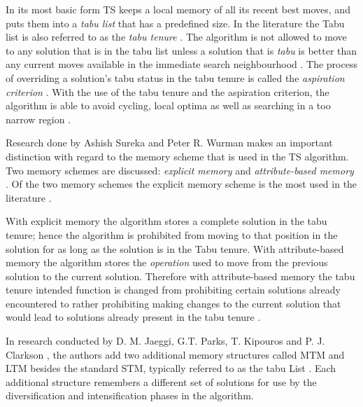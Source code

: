 In its most basic form \gls{TS} keeps a local memory of all its recent best moves, and puts them into a \emph{tabu list} that has a predefined size. In the literature the Tabu list is also referred to as the \emph{tabu tenure} \cite{TSHazardous,TabuCarryOver,ReactiveTabuVHR,TabuParameterization}. The algorithm is not allowed to move to any solution that is in the tabu list unless a solution that is \emph{tabu} is better than any current moves available in the immediate search neighbourhood \cite{TSHazardous,TabuCarryOver,ReactiveTabuVHR,TabuParameterization}. The process of overriding a solution's tabu status in the tabu tenure is called the \emph{aspiration criterion} \cite{TSHazardous,TabuCarryOver,ReactiveTabuVHR,TabuParameterization}. With the use of the tabu tenure and the aspiration criterion, the algorithm is able to avoid cycling, local optima as well as searching in a too narrow region \cite{TabuSingleMachineScheduling,CircuitTabu}.

Research done by Ashish Sureka and Peter R. Wurman makes an important distinction with regard to the memory scheme that is used in the \gls{TS} algorithm. Two memory schemes are discussed: \emph{explicit memory} and \emph{attribute-based memory} \cite{TabuBiddingStrats,TabuFormGames}. Of the two memory schemes the explicit memory scheme is the most used in the literature \cite{TabuVechicleRoutingWithTimeWindows}.

With explicit memory the algorithm stores a complete solution in the tabu tenure; hence the algorithm is prohibited from moving to that position in the solution for as long as the solution is in the Tabu tenure\cite{TabuBiddingStrats,TabuFormGames}. With attribute-based memory the algorithm stores the \emph{operation} used to move from the previous solution to the current solution\cite{TabuBiddingStrats,TabuFormGames}. Therefore with attribute-based memory the tabu tenure intended function is changed from prohibiting certain solutions already encountered to rather prohibiting making changes to the current solution that would lead to solutions already present in the tabu tenure \cite{TabuBiddingStrats,TabuFormGames}.

In research conducted by D. M. Jaeggi, G.T. Parks, T. Kipouros and P. J. Clarkson \cite{MultiObjTabu}, the authors add two additional memory structures called \gls{MTM} and \gls{LTM} besides the standard \gls{STM}, typically referred to as the tabu List \cite{MultiObjTabu}. Each additional structure remembers a different set of solutions for use by the diversification and intensification phases in the algorithm.

